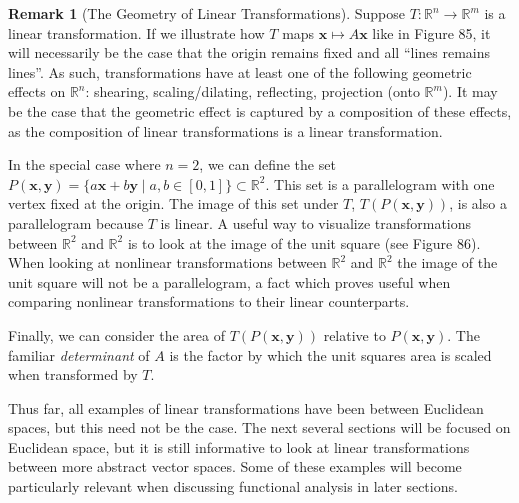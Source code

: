 \documentclass{article}
\newcommand{\R}{\mathbb{R}}
\newcommand{\x}{\mathbf{x}}
\newcommand{\y}{\mathbf{y}}
\theoremstyle{definition}
\newtheorem{remark}{Remark}[section]
\begin{document}
	\begin{remark}[The Geometry of Linear Transformations]
		Suppose $ T:\R^n\to\R^m $ is a linear transformation. If we illustrate how $ T $ maps $ \x\mapsto A\x $ like in Figure 85, it will necessarily be the case that the origin remains fixed and all ``lines remains lines''. As such, transformations have at least one of the following geometric effects on $ \R^n $: shearing, scaling/dilating, reflecting, projection (onto $ \R^m $). It may be the case that the geometric effect is captured by a composition of these effects, as the composition of linear transformations is a linear transformation. 
		\begin{figure}[h!]
			\centering
			\caption{}
		\end{figure}
		
		In the special case where $ n=2 $, we can define the set $ P(\x,\y)=\{a\x+b\y \mid a,b\in[0,1]\}\subset \R^2 $. This set is a parallelogram with one vertex fixed at the origin. The image of this set under $ T $, $ T(P(\x,\y)) $, is also a parallelogram because $ T $ is linear. A useful way to visualize transformations between $ \R^2 $ and $ \R^2 $ is to look at the image of the unit square (see Figure 86). When looking at nonlinear transformations between $ \R^2 $ and $ \R^2 $ the image of the unit square will not be a parallelogram, a fact which proves useful when comparing nonlinear transformations to their linear counterparts.
		
		Finally, we can consider the area of $ T(P(\x,\y)) $ relative to $ P(\x,\y) $. The familiar \textit{\color{red}determinant} of $ A $ is the factor by which the unit squares area is scaled when transformed by $ T $.  
	\end{remark}
	Thus far, all examples of linear transformations have been between Euclidean spaces, but this need not be the case. The next several sections will be focused on Euclidean space, but it is still informative to look at linear transformations between more abstract vector spaces. Some of these examples will become particularly relevant when discussing functional analysis in later sections.
\end{document}
